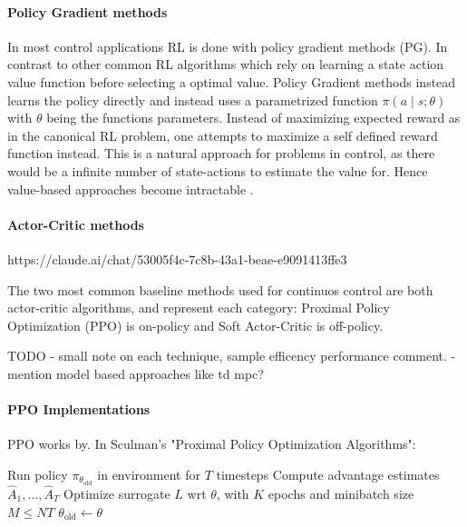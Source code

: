 \paragraph{Policy Gradient methods} In most control applications RL is done with policy gradient methods (PG). In contrast to other common RL algorithms which rely on learning a state action value function before selecting a optimal value. Policy Gradient methods instead learns the policy directly and instead uses a parametrized function $\pi(a \mid s; \theta)$ with $\theta$ being the functions parameters. Instead of maximizing expected reward as in the canonical RL problem, one attempts to maximize a self defined reward function instead. This is a natural approach for problems in control, as there would be a infinite number of state-actions to estimate the value for. Hence value-based approaches become intractable \parencite{weng2018bandit}.

\paragraph{Actor-Critic methods}

https://claude.ai/chat/53005f4c-7c8b-43a1-beae-e9091413ffe3


The two most common baseline methods used for continuos control are both actor-critic algorithms, and represent each category: Proximal Policy Optimization (PPO) \textcite{schulman2017ppo} is on-policy and Soft Actor-Critic \textcite{haarnoja2018soft} is off-policy.

TODO
- small note on each technique, sample efficency performance comment. 
- mention model based approaches like td mpc?

\paragraph{PPO Implementations} PPO works by. In Sculman's "Proximal Policy Optimization Algorithms":

\begin{algorithm}
\caption{PPO, Actor-Critic Style}
\label{alg:ppo}
\begin{algorithmic}[1]
        \State Run policy $\pi_{\theta_{\text{old}}}$ in environment for $T$ timesteps
        \State Compute advantage estimates $\hat{A}_1, \ldots, \hat{A}_T$
    \EndFor
    \State Optimize surrogate $L$ wrt $\theta$, with $K$ epochs and minibatch size $M \leq NT$
    \State $\theta_{\text{old}} \leftarrow \theta$
\EndFor
\end{algorithmic}
\end{algorithm}

